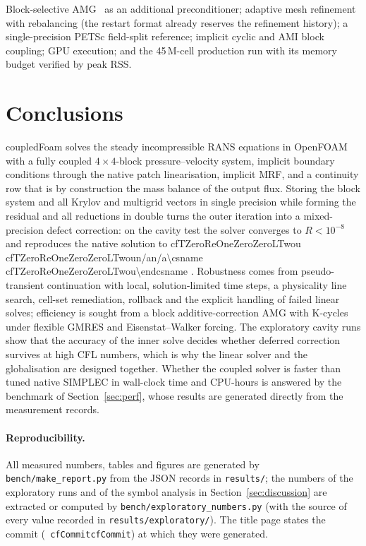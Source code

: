 \documentclass[11pt,a4paper]{article}
\makeatletter
\newcommand{\cfpendingmark}{\fbox{\scriptsize pending}}
\newcommand{\cfnum}[1]{%
  \ifcsname cf#1\endcsname\csname cf#1\endcsname\else\cfpendingmark\fi}
\def\cf@na{n/a}
\newcommand{\cfsci}[1]{%
  \ifcsname cf#1\endcsname
    \edef\cf@tmp{\csname cf#1\endcsname}%
    \ifx\cf@tmp\cf@na n/a\else\expandafter\num\expandafter{\cf@tmp}\fi
  \else\cfpendingmark\fi}
\newcommand{\code}[1]{\texttt{#1}}
\makeatother
\begin{document}
Block-selective AMG~\cite{Uroic2018,Uroic2021} as an additional preconditioner;
adaptive mesh refinement with rebalancing (the restart format already
reserves the refinement history); a single-precision PETSc field-split
reference; implicit cyclic and AMI block coupling; GPU execution; and the
45\,M-cell production run with its memory budget verified by peak RSS.

\section{Conclusions}\label{sec:concl}

coupledFoam solves the steady incompressible RANS equations in OpenFOAM
with a fully coupled $4\times4$-block pressure--velocity system, implicit
boundary conditions through the native patch linearisation, implicit MRF,
and a continuity row that is by construction the mass balance of the output
flux. Storing the block system and all Krylov and multigrid vectors in single
precision while forming the residual and all reductions in double turns the
outer iteration into a mixed-precision defect correction: on the cavity test
the solver converges to $R<10^{-8}$ and reproduces the native solution to
\cfsci{TZeroReOneZeroZeroLTwou}. Robustness comes from pseudo-transient
continuation with local, solution-limited time steps, a physicality line
search, cell-set remediation, rollback and the explicit handling of failed
linear solves; efficiency is sought from a block additive-correction AMG with
K-cycles under flexible GMRES and Eisenstat--Walker forcing. The exploratory
cavity runs show that the accuracy of the inner solve decides whether
deferred correction survives at high CFL numbers, which is why the linear
solver and the globalisation are designed together. Whether the coupled
solver is faster than tuned native SIMPLEC in wall-clock time and CPU-hours
is answered by the benchmark of Section~\ref{sec:perf}, whose results are
generated directly from the measurement records.

\paragraph{Reproducibility.} All measured numbers, tables and figures are
generated by \code{bench/make\_report.py} from the JSON records in
\code{results/}; the numbers of the exploratory runs and of the symbol
analysis in Section~\ref{sec:discussion} are extracted or computed by
\code{bench/exploratory\_numbers.py} (with the source of every value
recorded in \code{results/exploratory/}). The title page states the commit
(\code{\cfnum{Commit}}) at which they were generated.
\end{document}
